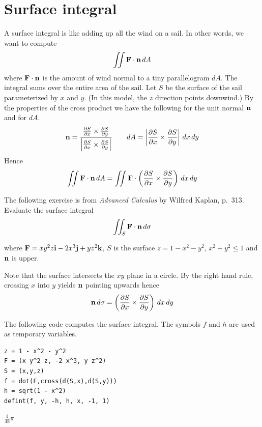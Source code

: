 
\newpage

\section{Surface integral}

A surface integral is like adding up all the wind on a sail.
In other words, we want to compute
$$\int\!\!\!\int{\bf F\cdot n}\,dA$$
where ${\bf F\cdot n}$ is the amount of wind normal to a tiny parallelogram $dA$.
The integral sums over the entire area of the sail.
Let $S$ be the surface of the sail parameterized by $x$ and $y$.
(In this model, the $z$ direction points downwind.)
By the properties of the cross product we have the following for the unit normal $\bf n$
and for $dA$.
$${\bf n}=\frac{{\frac{\partial S}{\partial x}\times\frac{\partial S}{\partial y}}}
{{\left|\frac{\partial S}{\partial x}\times\frac{\partial S}{\partial y}\right|}}\qquad
dA=\left|\frac{\partial S}{\partial x}\times\frac{\partial S}{\partial y}\right|\,dx\,dy$$
Hence
$$\int\!\!\!\int{\bf F\cdot n}\,dA=\int\!\!\!\int{\bf F}\cdot
\left({\frac{\partial S}{\partial x}\times\frac{\partial S}{\partial y}}\right)\,dx\,dy$$

\bigskip
The following exercise is from
{\it Advanced Calculus} by Wilfred Kaplan, p.~313.
Evaluate the surface integral
$$\int\!\!\!\int_S{\bf F\cdot n}\,d\sigma$$

where ${\bf F}=xy^2z{\bf i}-2x^3{\bf j}+yz^2{\bf k}$, $S$ is the surface
$z=1-x^2-y^2$, $x^2+y^2\le1$ and $\bf n$ is upper.

\bigskip
Note that the surface intersects the $xy$ plane in a circle.
By the right hand rule, crossing $x$ into $y$ yields $\bf n$ pointing upwards hence
$${\bf n}\,d\sigma=\left({\frac{\partial S}{\partial x}\times\frac{\partial S}{\partial y}}\right)\,dx\,dy$$

The following code computes the surface integral.
The symbols $f$ and $h$ are used as temporary variables.

{\color{blue}
\begin{verbatim}
z = 1 - x^2 - y^2
F = (x y^2 z, -2 x^3, y z^2)
S = (x,y,z)
f = dot(F,cross(d(S,x),d(S,y)))
h = sqrt(1 - x^2)
defint(f, y, -h, h, x, -1, 1)
\end{verbatim}
}

$\displaystyle \tfrac{1}{48}\pi$


